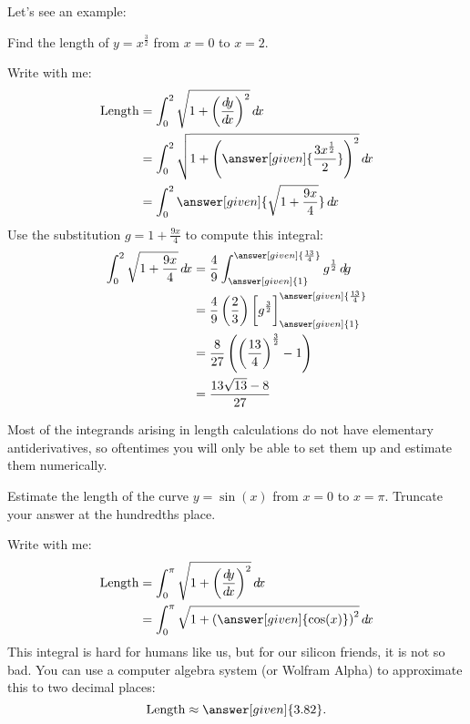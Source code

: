 \documentclass{ximera}
\begin{document}
Let's see an example:
\begin{example}%
  Find the length of $y = x^{\frac{3}{2}}$ from $x=0$ to $x=2$.
  \begin{explanation}
    Write with me:
    \begin{align*}
      \text{Length} &= \int_0^2 \sqrt{1+\left( \frac{\d y}{ \d x}\right)^2} \d x\\
      &= \int_0^2 \sqrt{1+\left(
        \answer[given]{\frac{3 x^{\frac{1}{2}}}{2}}\right)^2} \d x\\
      &= \int_0^2 \answer[given]{\sqrt{1+\frac{9x}{4}}} \d x
    \end{align*}
      Use the substitution $g = 1+\frac{9x}{4}$ to compute this integral:
      \begin{align*}
	\int_0^2 \sqrt{1+\frac{9x}{4}} \d x &= \frac{4}{9} \int_{\answer[given]{1}}^{\answer[given]{\frac{13}{4}}} g^\frac{1}{2} \d g\\
	&= \frac{4}{9} \left(\frac{2}{3}\right) \eval{g^{\frac{3}{2}}}_{\answer[given]{1}}^{\answer[given]{\frac{13}{4}}}\\
	&=\frac{8}{27} \left(\left(\frac{13}{4}\right)^\frac{3}{2} - 1\right)\\
	&=\frac{13\sqrt{13} - 8}{27}
      \end{align*}
  \end{explanation}
\end{example}

Most of the integrands arising in length calculations do not have
elementary antiderivatives, so oftentimes you will only be able to set
them up and estimate them numerically.

\begin{example}
  Estimate the length of the curve $y = \sin(x)$ from $x=0$ to $x =
  \pi$.  Truncate your answer at the hundredths place.
  \begin{explanation}
    Write with me:
    \begin{align*}
      \text{Length} &= \int_0^\pi \sqrt{1+\left( \frac{\d y}{ \d x}\right)^2} \d x\\
      &= \int_0^\pi \sqrt{1+\left(
        \answer[given]{\cos(x)}\right)^2} \d x
    \end{align*}
    This integral is hard for humans like us, but for our silicon
    friends, it is not so bad.  You can use a computer algebra system
    (or Wolfram Alpha) to approximate this to two decimal places:
    \[
    \text{Length} \approx \answer[given]{3.82}.
    \]
  \end{explanation}
\end{example}
\end{document}
